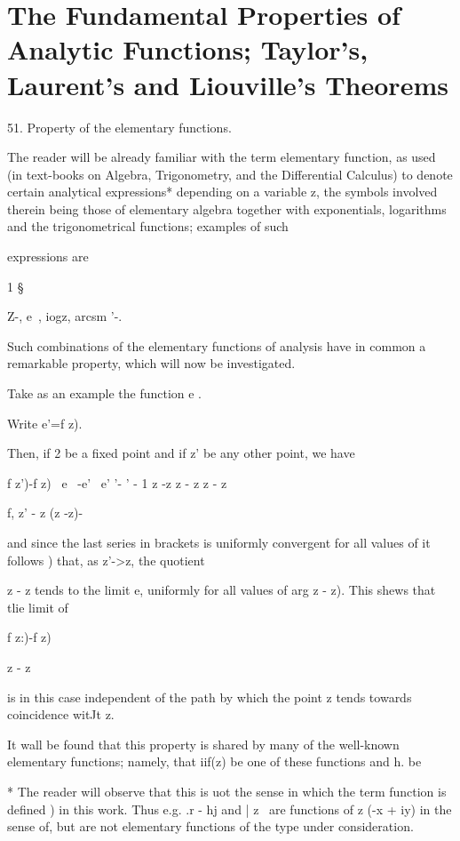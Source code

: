 \chapter{The Fundamental Properties of Analytic Functions; 
Taylor's, Laurent's and Liouville's Theorems} 

51. Property of the elementary functions.

The reader will be already familiar with the term elementary function,
as used (in text-books on Algebra, Trigonometry, and the Differential
Calculus) to denote certain analytical expressions* depending on a
variable z, the symbols involved therein being those of elementary
algebra together with exponentials, logarithms and the trigonometrical
functions; examples of such

expressions are

1  §

Z-, e~, iogz, arcsm '-.

Such combinations of the elementary functions of analysis have in
common a remarkable property, which will now be investigated.

Take as an example the function e .

Write e'=f z).

Then, if 2 be a fixed point and if z' be any other point, we have

f z')-f z) \ e~ -e' \, e' '- ' - 1 z -z z - z z - z

f, z' - z (z -z)-

and since the last series in brackets is uniformly convergent for all
values of it follows ) that, as z'->z, the quotient

z - z tends to the limit e, uniformly for all values of arg z - z).
This shews that tlie limit of

f z:)-f z)

z - z

is in this case independent of the path by which the point z tends
towards coincidence witJt z.

It wall be found that this property is shared by many of the
well-known elementary functions; namely, that iif(z) be one of these
functions and h. be

* The reader will observe that this is uot the sense in which the term
function is defined ) in this work. Thus e.g. .r - hj and | z \
are functions of z (-x + iy) in the sense of, but are not
elementary functions of the type under consideration.

